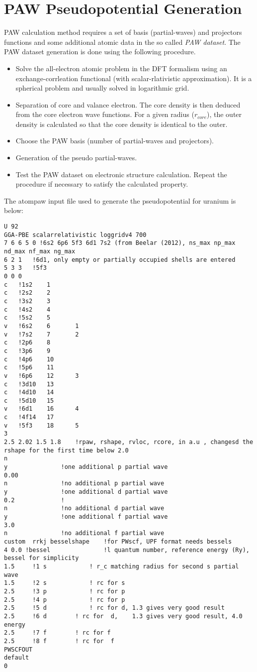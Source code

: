 \chapter{PAW Pseudopotential Generation}\label{appen_pseudo}
PAW calculation method requires a set of basis (partial-waves) and projectors functions and some additional atomic data in the so called \textit{PAW dataset}. The PAW dataset generation is done using the following procedure.

\begin{itemize}
	\item Solve the all-electron atomic problem in the DFT formalism using an exchange-corrleation functional (with scalar-rlativistic approximation). It is a spherical problem and usually solved in logarithmic grid.
	\item Separation of core and valance electron. The core density is then deduced from the core electron wave functions. For a given radius ($r_{core}$), the outer density is calculated so that the core density is identical to the outer.
	\item Choose the PAW basis (number of partial-waves and projectors).
	\item Generation of the pseudo partial-waves.
	\item Test the PAW dataset on electronic structure calculation. Repeat the procedure if necessary to satisfy the calculated property.
\end{itemize}
\pagebreak
The atompaw input file used to generate the pseudopotential for uranium is below:
\lstset{style=atpw}
\begin{lstlisting}
U 92
GGA-PBE	scalarrelativistic loggridv4 700 
7 6 6 5 0 !6s2 6p6 5f3 6d1 7s2 (from Beelar (2012), ns_max np_max nd_max nf_max ng_max
6 2 1	!6d1, only empty or partially occupied shells are entered
5 3 3	!5f3
0 0 0
c	!1s2	1	
c	!2s2	2
c	!3s2	3
c	!4s2	4
c	!5s2	5
v	!6s2	6		1
v	!7s2	7		2
c	!2p6	8
c	!3p6	9
c	!4p6	10
c	!5p6	11		
v	!6p6	12		3
c	!3d10	13
c	!4d10	14
c	!5d10	15
v	!6d1	16		4
c	!4f14	17
v	!5f3	18		5
3
2.5 2.02 1.5 1.8	!rpaw, rshape, rvloc, rcore, in a.u , changesd the rshape for the first time below 2.0
n
y				!one additional p partial wave
0.00
n				!no additional p partial wave
y				!one additional d partial wave
0.2				!
n				!no additional d partial wave
y				!one additional f partial wave
3.0
n				!no additional f partial wave
custom  rrkj besselshape    !for PWscf, UPF format needs bessels        
4 0.0 !bessel     			!l quantum number, reference energy (Ry), bessel for simplicity
1.5		!1 s			! r_c matching radius for second s partial wave
1.5		!2 s			! rc for s
2.5		!3 p			! rc for p
2.5		!4 p			! rc for p
2.5		!5 d	        ! rc for d, 1.3 gives very good result
2.5		!6 d        ! rc for  d,	1.3 gives very good result, 4.0 energy
2.5		!7 f        ! rc for f
2.5		!8 f        ! rc for  f
PWSCFOUT
default
0

\end{lstlisting}
